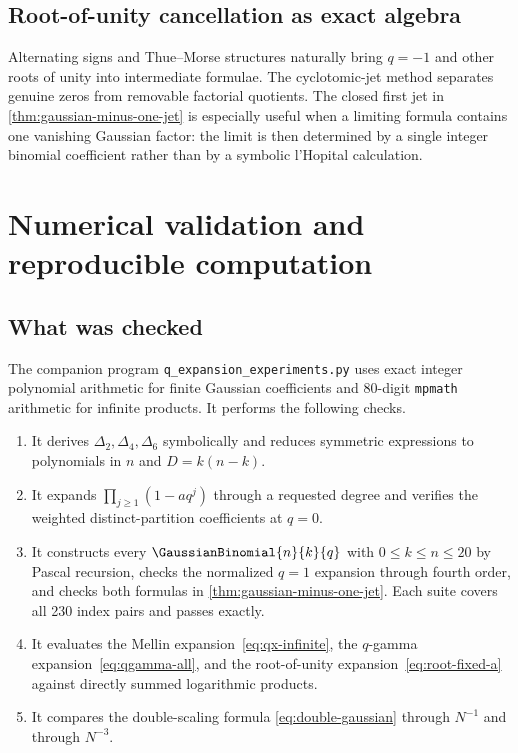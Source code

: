 \documentclass[11pt,oneside]{article}
\theoremstyle{definition}
\theoremstyle{remark}
\let\reporttopsection\section
\let\reportsubsection\subsection
\let\chapter\reporttopsection
\let\section\reportsubsection
\begin{document}
\section{Root-of-unity cancellation as exact algebra}

Alternating signs and Thue--Morse structures naturally bring $q=-1$ and other
roots of unity into intermediate formulae.  The cyclotomic-jet method separates
genuine zeros from removable factorial quotients.  The closed first jet in
\cref{thm:gaussian-minus-one-jet} is especially useful when a limiting formula
contains one vanishing Gaussian factor: the limit is then determined by a
single integer binomial coefficient rather than by a symbolic l'Hopital
calculation.

\chapter{Numerical validation and reproducible computation}\label{chap:numerics}

\section{What was checked}

The companion program \texttt{q\_expansion\_experiments.py} uses exact integer
polynomial arithmetic for finite Gaussian coefficients and 80-digit
\texttt{mpmath} arithmetic for infinite products.  It performs the following
checks.

\begin{enumerate}
\item It derives $\Delta_2,\Delta_4,\Delta_6$ symbolically and reduces symmetric
      expressions to polynomials in $n$ and $D=k(n-k)$.
\item It expands $\prod_{j\ge1}(1-aq^j)$ through a requested degree and verifies
      the weighted distinct-partition coefficients at $q=0$.
\item It constructs every $\GaussianBinomial{n}{k}{q}$ with $0\le k\le n\le20$ by Pascal
      recursion, checks the normalized $q=1$ expansion through fourth order,
      and checks both formulas in \cref{thm:gaussian-minus-one-jet}.  Each suite
      covers all 230 index pairs and passes exactly.
\item It evaluates the Mellin expansion~\eqref{eq:qx-infinite}, the
      $q$-gamma expansion~\eqref{eq:qgamma-all}, and the root-of-unity
      expansion~\eqref{eq:root-fixed-a} against directly summed logarithmic
      products.
\item It compares the double-scaling formula
      \eqref{eq:double-gaussian} through $N^{-1}$ and through $N^{-3}$.
\end{enumerate}
\end{document}
